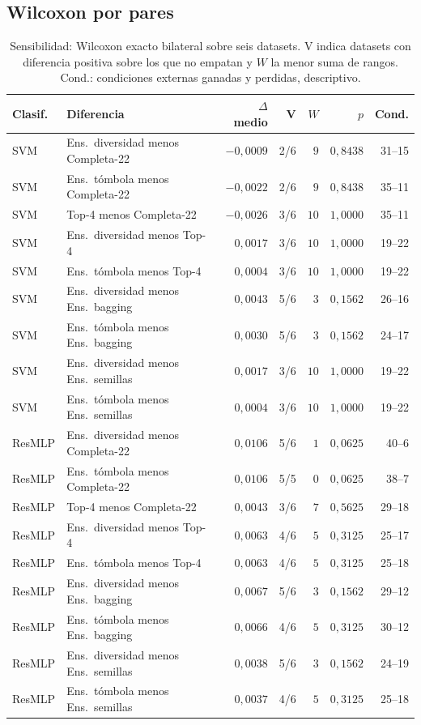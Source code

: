 \documentclass[11pt,a4paper]{article}
\begin{document}
\subsection{Wilcoxon por pares}

\begin{table}[H]
\centering\fontsize{8}{10}\selectfont\setlength{\tabcolsep}{3.0pt}
\caption{Sensibilidad: Wilcoxon exacto bilateral sobre seis datasets. V indica datasets con diferencia positiva sobre los que no empatan y $W$ la menor suma de rangos. Cond.: condiciones externas ganadas y perdidas, descriptivo.}
\label{tab:sel-sensitivity}
\begin{tabular}{@{}llrrrrr@{}}
\toprule
Clasif. & Diferencia & $\Delta$ medio & V & $W$ & $p$ & Cond. \\
\midrule
SVM & Ens.\ diversidad menos Completa-22 & $-0{,}0009$ & 2/6 & $9$ & $0{,}8438$ & 31--15 \\
SVM & Ens.\ tómbola menos Completa-22 & $-0{,}0022$ & 2/6 & $9$ & $0{,}8438$ & 35--11 \\
SVM & Top-4 menos Completa-22 & $-0{,}0026$ & 3/6 & $10$ & $1{,}0000$ & 35--11 \\
SVM & Ens.\ diversidad menos Top-4 & $0{,}0017$ & 3/6 & $10$ & $1{,}0000$ & 19--22 \\
SVM & Ens.\ tómbola menos Top-4 & $0{,}0004$ & 3/6 & $10$ & $1{,}0000$ & 19--22 \\
SVM & Ens.\ diversidad menos Ens.\ bagging & $0{,}0043$ & 5/6 & $3$ & $0{,}1562$ & 26--16 \\
SVM & Ens.\ tómbola menos Ens.\ bagging & $0{,}0030$ & 5/6 & $3$ & $0{,}1562$ & 24--17 \\
SVM & Ens.\ diversidad menos Ens.\ semillas & $0{,}0017$ & 3/6 & $10$ & $1{,}0000$ & 19--22 \\
SVM & Ens.\ tómbola menos Ens.\ semillas & $0{,}0004$ & 3/6 & $10$ & $1{,}0000$ & 19--22 \\
ResMLP & Ens.\ diversidad menos Completa-22 & $0{,}0106$ & 5/6 & $1$ & $0{,}0625$ & 40--6 \\
ResMLP & Ens.\ tómbola menos Completa-22 & $0{,}0106$ & 5/5 & $0$ & $0{,}0625$ & 38--7 \\
ResMLP & Top-4 menos Completa-22 & $0{,}0043$ & 3/6 & $7$ & $0{,}5625$ & 29--18 \\
ResMLP & Ens.\ diversidad menos Top-4 & $0{,}0063$ & 4/6 & $5$ & $0{,}3125$ & 25--17 \\
ResMLP & Ens.\ tómbola menos Top-4 & $0{,}0063$ & 4/6 & $5$ & $0{,}3125$ & 25--18 \\
ResMLP & Ens.\ diversidad menos Ens.\ bagging & $0{,}0067$ & 5/6 & $3$ & $0{,}1562$ & 29--12 \\
ResMLP & Ens.\ tómbola menos Ens.\ bagging & $0{,}0066$ & 4/6 & $5$ & $0{,}3125$ & 30--12 \\
ResMLP & Ens.\ diversidad menos Ens.\ semillas & $0{,}0038$ & 5/6 & $3$ & $0{,}1562$ & 24--19 \\
ResMLP & Ens.\ tómbola menos Ens.\ semillas & $0{,}0037$ & 4/6 & $5$ & $0{,}3125$ & 25--18 \\
\bottomrule
\end{tabular}
\end{table}
\end{document}
